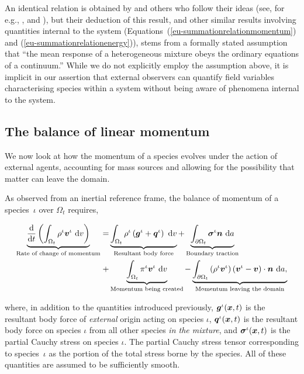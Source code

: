 An identical relation is obtained by \citet{TruesdellToupin:60} and
others who follow their ideas (see, for e.g., \citet{bowen76},
\citet{passmanetal} and \citet{ateshian07}), but their deduction of
this result, and other similar results involving quantities internal
to the system (Equations~(\ref{eu-summationrelationmomentum}) and
(\ref{eu-summationrelationenergy})), stems from a formally stated
assumption that ``the mean response of a heterogeneous mixture obeys
the ordinary equations of a continuum.'' While we do not explicitly
employ the assumption above, it is implicit in our assertion that
external observers can quantify field variables characterising species
within a system without being aware of phenomena internal to the
system.

\subsection{The balance of linear momentum}
\label{eu-balance-of-linear-momentum}

We now look at how the momentum of a species evolves under the action
of external agents, accounting for mass sources and allowing for the
possibility that matter can leave the domain.

As observed from an inertial reference frame, the balance of momentum
of a species~$\iota$ over $\Omega_{t}$ requires,

\begin{equation}
\begin{split}
\underbrace{\frac{\mathrm{d}}{\mathrm{d}t}\left(\int_{\Omega_{t}}
  \rho^{\iota} \mbox{\boldmath$ v$}^{\iota}\ \mathrm{d}v \right)}_{\text{Rate of change
    of momentum}} = & \underbrace{\int_{\Omega_{t}} \rho^{\iota}
  \left(\mbox{\boldmath$ g$}^{\iota} +
  \mbox{\boldmath$ q$}^{\iota}\right)\ \mathrm{d}v}_{\text{Resultant body force}} +
\underbrace{\int_{\partial \Omega_{t}}
  \mbox{\boldmath$\sigma$}^{\iota}\mbox{\boldmath$ n$}\ \mathrm{d}a}_{\text{Boundary traction}}\\ +
& \underbrace{\int_{\Omega_{t}}
  \pi^{\iota}\mbox{\boldmath$ v$}^{\iota}\ \mathrm{d}v}_{\text{Momentum being created}}
- \underbrace{\int_{\partial \Omega_{t}} \left(\rho^{\iota}
  \mbox{\boldmath$ v$}^{\iota} \right) \left(\mbox{\boldmath$ v$}^{\iota} - \mbox{\boldmath$ v$}\right) \cdot
  \mbox{\boldmath$ n$}\ \mathrm{d}a,}_{\text{Momentum leaving the domain}}
\end{split}
\label{eu-globalbalanceofmomentum}
\end{equation}

\noindent where, in addition to the quantities introduced previously,
$\mbox{\boldmath$ g$}^{\iota}(\mbox{\boldmath$ x$},t)$ is the resultant body force of {\em external}
origin acting on species $\iota$, $\mbox{\boldmath$ q$}^{\iota}(\mbox{\boldmath$ x$},t)$ is the
resultant body force on species $\iota$ from all other species {\em in
  the mixture}, and $\mbox{\boldmath$\sigma$}^{\iota}(\mbox{\boldmath$ x$},t)$ is the partial Cauchy
stress on species $\iota$. The partial Cauchy stress tensor
corresponding to species~$\iota$ as the portion of the total stress
borne by the species. All of these quantities are assumed to be
sufficiently smooth.

